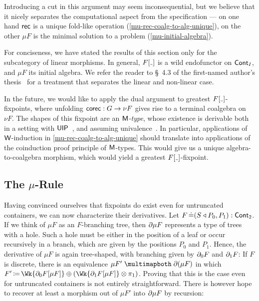Introducing a cut in this argument may seem inconsequential,
but we believe that it nicely separates the computational aspect
from the specification
---
on one hand \( \operatorname{\mathsf{rec}} \) is a unique fold-like operation (\autoref{mu-rec-coalg-to-alg-unique}),
on the other \( \mu F \) is the minimal solution to a problem (\autoref{mu-initial-algebra}).

For conciseness, we have stated the results of this section only for the subcategory of linear morphisms.
In general, \( \Subst{F}{\Blank} \) is a wild endofunctor on \( \operatorname{\mathsf{Cont}}_{I} \),
and \( \mu F \) its initial algebra.
We refer the reader to \S~4.3 of the first-named author's thesis~\cite{Joram2026DatatypesSymmetriesHomotopy}
for a treatment that separates the linear and non-linear case.

In the future, we would like to apply the dual argument to greatest \( \Subst{F}{\Blank} \)-fixpoints,
where unfolding \( \mathsf{corec} : G \to \nu F \) gives rise to a terminal coalgebra on \( \nu F \).
The shapes of this fixpoint are an \emph{\( \mathsf{M} \)-type},
whose existence is derivable both in a setting with \( \mathsf{UIP} \)~\cite{AltenkirchEtAl2015Indexedcontainers},
and assuming univalence~\cite{AhrensEtAl2015NonWellfoundedTrees}.
In particular, applications of \( \W \)-induction in \autoref{mu-rec-coalg-to-alg-unique}
should translate into applications of the coinduction proof principle of \( \mathsf{M} \)-types.
This would give us a unique algebra-to-coalgebra morphism,
which would yield a greatest \( \Subst{F}{\Blank} \)-fixpoint.

\subsection{The \texorpdfstring{\( \mu \)-}{Fixpoint }Rule}

Having convinced ourselves that fixpoints do exist even for untruncated containers, we can now characterize their derivatives.
Let \( F \operatorname{\mathrel{\doteq}} (S\mathbin{\triangleleft}P_0, P_1) : \operatorname{\mathsf{Cont}}_{2} \).
If we think of \( \mu F \) as an \( F \)-branching tree, then \( \partial{\mu F} \) represents a type of trees with a hole.
Such a hole must be either in the position of a leaf or occur recursively in a branch,
which are given by the positions \( P_0 \) and \( P_1 \).
Hence, the derivative of \( \mu F \) is again tree-shaped,
with branching given by \( \partial_0{F} \) and \( \partial_1{F} \):
If \( F \) is discrete, there is an equivalence
\(
  \CartIso { \mu F' }{ \Der(\mu F) }
\)
in which
\(
  F' \DefEq
    { \Wk{\Der_0{F}[ {\mu F} ]} }
      \CPlus
    (
      \Wk{\Der_1{F}[ {\mu F} ]}
        \CTimes
      \Proj{1}
    )
\).
Proving that this is the case even for untruncated containers is not entirely straightforward.
There is however hope to recover at least a morphism out of \( \mu F' \) into \( \partial{\mu F} \) by recursion:

